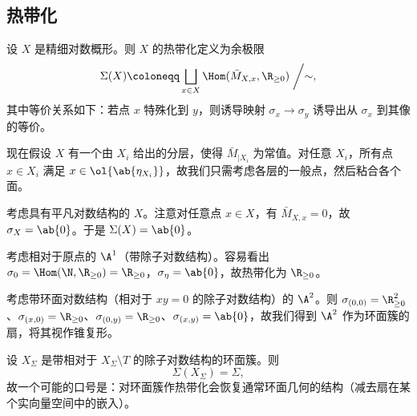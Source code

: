 \subsection{热带化}%
\label{sub:Tropicalization}

设 \(X\) 是精细对数概形。则 \(X\) 的热带化定义为余极限
\[\Sigma(X) \coloneqq \bigsqcup_{x \in X} \Hom(\bar{M}_{X,x}, \R_{\geq 0}) \biggm/ \sim, \]
其中等价关系如下：若点 \(x\) 特殊化到 \(y\)，则诱导映射 \(\sigma_x \to \sigma_y\) 诱导出从 \(\sigma_x\) 到其像的等价。

现在假设 \(X\) 有一个由 \(X_i\) 给出的分层，使得 \(\bar{M}_{|X_i}\) 为常值。对任意 \(X_i\)，所有点 \(x \in X_i\) 满足 \(x \in \ol{\ab\{\eta_{X_i}\}}\)，故我们只需考虑各层的一般点，然后粘合各个面。

\begin{exm}
    考虑具有平凡对数结构的 \(X\)。注意对任意点 \(x \in X\)，有 \(\bar{M}_{X,x} = 0\)，故 \(\sigma_X = \ab\{0\}\)。于是 \(\Sigma(X) = \ab\{0\}\)。
\end{exm}

\begin{exm}
    考虑相对于原点的 \(\A^1\)（带除子对数结构）。容易看出 \(\sigma_0 = \Hom(\N, \R_{\geq 0}) = \R_{\geq 0}\)，\(\sigma_{\eta} = \ab\{0\}\)，故热带化为 \(\R_{\geq 0}\)。
\end{exm}

\begin{exm}
    考虑带环面对数结构（相对于 \(xy = 0\) 的除子对数结构）的 \(\A^2\)。则 \(\sigma_{(0,0)} = \R^2_{\geq 0}\)、\(\sigma_{(x,0)} = \R_{\geq 0}\)、\(\sigma_{(0,y)} = \R_{\geq 0}\)、\(\sigma_{(x,y)} = \ab\{0\}\)，故我们得到 \(\A^2\) 作为环面簇的扇，将其视作锥复形。
\end{exm}

\begin{exm}
    设 \(X_{\Sigma}\) 是带相对于 \(X_{\Sigma} \setminus T\) 的除子对数结构的环面簇。则
    \[ \Sigma(X_{\Sigma}) = \Sigma, \]
    故一个可能的口号是：对环面簇作热带化会恢复通常环面几何的结构（减去扇在某个实向量空间中的嵌入）。
\end{exm}

